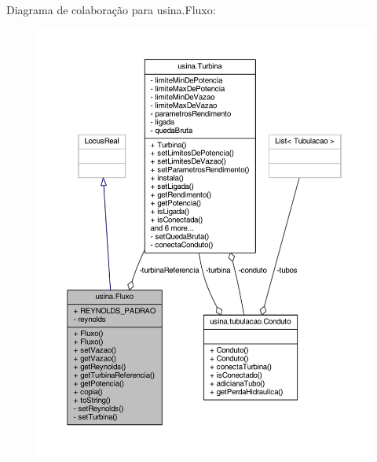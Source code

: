 Diagrama de colaboração para usina.\-Fluxo\-:
\nopagebreak
\begin{figure}[H]
\begin{center}
\leavevmode
\includegraphics[width=350pt]{classusina_1_1_fluxo__coll__graph}
\end{center}
\end{figure}
